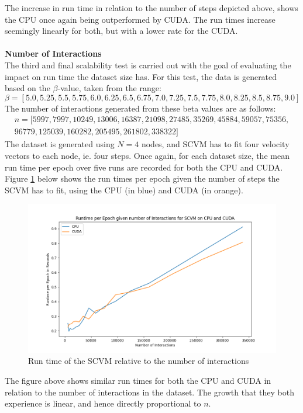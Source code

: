 \vspace*{-0.2cm}
\noindent
The increase in run time in relation to the number of steps depicted above, shows the CPU once again being outperformed by CUDA.
The run times increase seemingly linearly for both, but with a lower rate for the CUDA.
\\\\
\textbf{Number of Interactions}
\\
The third and final scalability test is carried out with the goal of evaluating the impact on run time the dataset size has.
For this test, the data is generated based on the $\beta$-value, taken from the range:
\begin{equation*}
    \beta = [5.0, 5.25, 5.5, 5.75, 6.0, 6.25, 6.5, 6.75, 7.0, 7.25, 7.5, 7.75, 8.0, 8.25, 8.5, 8.75, 9.0]
\end{equation*}
The number of interactions generated from these beta values are as follows:
\begin{align*}
    n = [5997, 7997, 10249, 13006, 16387, 21098, 27485, 35269, 45884, 59057, 75356, 
    \\96779, 125039, 160282, 205495, 261802, 338322]
\end{align*}
\noindent
The dataset is generated using $N = 4$ nodes, and SCVM has to fit four velocity vectors to each node, ie. four steps.
Once again, for each dataset size, the mean run time per epoch over five runs are recorded for both the CPU and CUDA.
Figure \ref{fig:NumInteractionsRuntimes} below shows the run times per epoch given the number of steps the SCVM has to fit, using the CPU (in blue) and CUDA (in orange).

\begin{figure}[H]
    \centering
    \includegraphics[width=\textwidth]{0_images/numinteractions_runtime2.png}
    \caption{Run time of the SCVM relative to the number of interactions}
    \label{fig:NumInteractionsRuntimes}
\end{figure}
\noindent
The figure above shows similar run times for both the CPU and CUDA in relation to the number of interactions in the dataset.
The growth that they both experience is linear, and hence directly proportional to $n$.